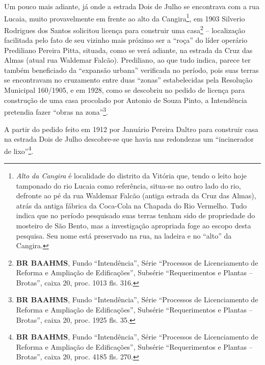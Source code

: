 Um pouco mais adiante, já onde a estrada Dois de Julho se encontrava com a rua Lucaia, muito provavelmente em frente ao alto da Cangira\footnote{\textit{Alto da Cangira} é localidade do distrito da Vitória que, tendo o leito hoje tamponado do rio Lucaia como referência, situa-se no outro lado do rio, defronte ao pé da rua Waldemar Falcão (antiga estrada da Cruz das Almas), atrás da antiga fábrica da Coca-Cola na Chapada do Rio Vermelho. Tudo indica que no período pesquisado suas terras tenham sido de propriedade do mosteiro de São Bento, mas a investigação apropriada foge ao escopo desta pesquisa. Seu nome está preservado na rua, na ladeira e no ``alto'' da Cangira.}, em 1903 Silverio Rodrigues dos Santos solicitou licença para construir uma casa\footnote{\textbf{BR BAAHMS}, Fundo ``Intendência'', Série ``Processos de Licenciamento de Reforma e Ampliação de Edificações'', Subsérie ``Requerimentos e Plantas -- Brotas'', caixa 20, proc. 1013 fls. 316.} -- localização facilitada pelo fato de seu vizinho mais próximo ser a ``roça'' do líder operário Prediliano Pereira Pitta, situada, como se verá adiante, na estrada da Cruz das Almas (atual rua Waldemar Falcão). Prediliano, ao que tudo indica, parece ter também beneficiado da ``expansão urbana'' verificada no período, pois suas terras se encontravam no cruzamento entre duas ``zonas'' estabelecidas pela Resolução Municipal 160/1905, e em 1928, como se descobriu no pedido de licença para construção de uma casa procolado por Antonio de Souza Pinto, a Intendência pretendia fazer ``obras na zona''\footnote{\textbf{BR BAAHMS}, Fundo ``Intendência'', Série ``Processos de Licenciamento de Reforma e Ampliação de Edificações'', Subsérie ``Requerimentos e Plantas -- Brotas'', caixa 20, proc. 1925 fls. 35.}.


A partir do pedido feito em 1912 por Januário Pereira Daltro para construir casa na estrada Dois de Julho descobre-se que havia nas redondezas um ``incinerador de lixo''\footnote{\textbf{BR BAAHMS}, Fundo ``Intendência'', Série ``Processos de Licenciamento de Reforma e Ampliação de Edificações'', Subsérie ``Requerimentos e Plantas -- Brotas'', caixa 20, proc. 4185 fls. 270.}. 


